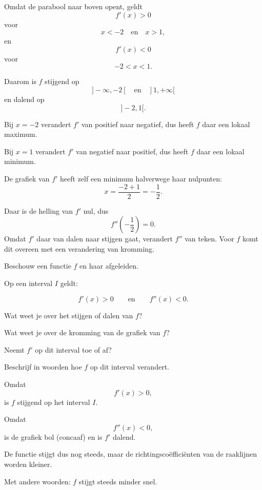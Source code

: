 \documentclass{ximera}
\begin{document}
\begin{oefening}{\oefU\ESS}
\begin{oplossing}
Omdat de parabool naar boven opent, geldt
\[
f'(x)>0
\]
voor
\[
x<-2
\quad\text{en}\quad
x>1,
\]
en
\[
f'(x)<0
\]
voor
\[
-2<x<1.
\]

Daarom is $f$ stijgend op
\[
]-\infty,-2[
\quad\text{en}\quad
]1,+\infty[
\]
en dalend op
\[
]-2,1[.
\]

Bij $x=-2$ verandert $f'$ van positief naar negatief, dus heeft $f$ daar
een lokaal maximum.

Bij $x=1$ verandert $f'$ van negatief naar positief, dus heeft $f$ daar
een lokaal minimum.

De grafiek van $f'$ heeft zelf een minimum halverwege haar nulpunten:
\[
x=\frac{-2+1}{2}=-\frac12.
\]

Daar is de helling van $f'$ nul, dus
\[
f''\left(-\frac12\right)=0.
\]
Omdat $f'$ daar van dalen naar stijgen gaat, verandert $f''$ van teken.
Voor $f$ komt dit overeen met een verandering van kromming.

\end{oplossing}

\end{oefening}



\begin{oefening}{\oefU\ESS}

Beschouw een functie $f$ en haar afgeleiden.

Op een interval $I$ geldt:

\[
f'(x)>0
\qquad\text{en}\qquad
f''(x)<0.
\]

\begin{question}
Wat weet je over het stijgen of dalen van $f$?
\end{question}

\begin{question}
Wat weet je over de kromming van de grafiek van $f$?
\end{question}

\begin{question}
Neemt $f'$ op dit interval toe of af?
\end{question}

\begin{question}
Beschrijf in woorden hoe $f$ op dit interval verandert.
\end{question}

\begin{oplossing}

Omdat
\[
f'(x)>0,
\]
is $f$ stijgend op het interval $I$.

Omdat
\[
f''(x)<0,
\]
is de grafiek bol (concaaf) en is $f'$ dalend.

De functie stijgt dus nog steeds, maar de richtingscoëfficiënten van de
raaklijnen worden kleiner.

Met andere woorden: $f$ stijgt steeds minder snel.

\end{oplossing}

\end{oefening}
\end{document}
